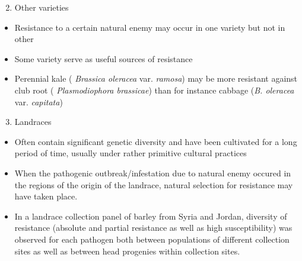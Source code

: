 \documentclass[11pt,dvipsnames,ignorenonframetext,aspectratio=169]{beamer}
\providecommand{\tightlist}{%
  \setlength{\itemsep}{0pt}\setlength{\parskip}{0pt}}
\begin{document}
\begin{frame}{}
\protect\hypertarget{section}{}
\small

\begin{enumerate}
\setcounter{enumi}{1}
\tightlist
\item
  Other varieties
\end{enumerate}

\begin{itemize}
\tightlist
\item
  Resistance to a certain natural enemy may occur in one variety but not
  in other
\item
  Some variety serve as useful sources of resistance
\item
  Perennial kale ( \emph{Brassica oleracea} var. \emph{ramosa}) may be
  more resistant against club root ( \emph{Plasmodiophora brassicae})
  than for instance cabbage (\emph{B. oleracea} var. \emph{capitata})
\end{itemize}

\begin{enumerate}
\setcounter{enumi}{2}
\tightlist
\item
  Landraces
\end{enumerate}

\begin{itemize}
\tightlist
\item
  Often contain significant genetic diversity and have been cultivated
  for a long period of time, usually under rather primitive cultural
  practices
\item
  When the pathogenic outbreak/infestation due to natural enemy occured
  in the regions of the origin of the landrace, natural selection for
  resistance may have taken place.
\item
  In a landrace collection panel of barley from Syria and Jordan,
  diversity of resistance (absolute and partial resistance as well as
  high susceptibility) was observed for each pathogen both between
  populations of different collection sites as well as between head
  progenies within collection sites\citep{van1989diversity}.
\end{itemize}
\end{frame}
\end{document}
